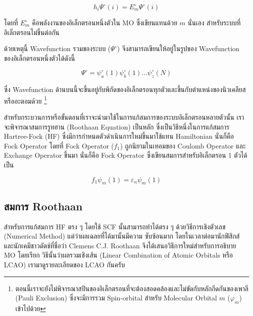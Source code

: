 \begin{equation}\label{eq:tise_elec_i}
    h_{i} \Psi^{\circ}(i) = E^{\circ}_{m} \Psi^{\circ}(i)
\end{equation}

\noindent โดยที่ $E^{\circ}_{m}$ คือพลังงานของอิเล็กตรอนหนึ่งตัวใน MO ซึ่งเขียนแทนด้วย $m$ นั่นเอง สำหรับระบบที่อิเล็กตรอนไม่ขึ้นต่อกัน

ด้วยเหตุนี้ Wavefunction รวมของระบบ ($\Psi^{\circ}$) จึงสามารถเขียนให้อยู่ในรูปของ Wavefunction ของอิเล็กตรอนหนึ่งตัวได้ดังนี้

\begin{equation}
    \Psi^{\circ} = \psi^{\circ}_{a}(1) \psi^{\circ}_{b}(1) \dots \psi^{\circ}_{z}(N)
\end{equation}

\noindent ซึ่ง Wavefunction ด้านบนนี้จะขึ้นอยู่กับพิกัดของอิเล็กตรอนทุกตัวและขึ้นกับตำแหน่งของนิวเคลียสหรืออะตอมด้วย%
\footnote{ตอนนี้เราจะยังไม่พิจารณาสปินของอิเล็กตรอนที่จะต้องสอดคล้องและไม่ขัดกับหลักกีดกันของเพาลี (Pauli Exclusion)
ซึ่งจะมีการรวม Spin-orbital สำหรับ Molecular Orbital $m$ ($\varphi_{m}$) เข้าไปด้วย}

สำหรับกระบวนการหรือขั้นตอนที่เราจะนำมาใช้ในการแก้สมการของระบบอิเล็กตรอนหลายตัวนั้น เราจะพิจารณาสมการรูทฮาน (Roothaan Equation) 
เป็นหลัก ซึ่งเป็นวิธีหนึ่งในการแก้สมการ Hartree-Fock (HF) ซึ่งมีการกำหนดตัวดำเนินการใหม่ขึ้นมาใช้แทน Hamiltonian นั่นก็คือ Fock Operator 
โดยที่ Fock Operator ($f_{1}$) ถูกนิยามในเทอมของ Coulomb Operator และ Exchange Operator ขึ้นมา นั่นก็คือ Fock Operator 
ซึ่งเขียนสมการสำหรับอิเล็กตรอน 1 ตัวได้เป็น

\begin{equation}\label{eq:fock}
    f_{1} \psi_{m}(1) = \varepsilon_{n} \psi_{m}(1)
\end{equation}

\subsection{สมการ Roothaan}
\label{ssec:roothaan}

สำหรับการแก้สมการ HF ตรง ๆ โดยใช้ SCF นั้นสามารถทำได้ตรง ๆ ด้วยวิธีการเชิงตัวเลข (Numerical Method) แต่ว่าผลเฉลยที่ได้มานั้นมีความ%
ซับซ้อนมาก โดยในเวลาต่อมานักฟิสิกส์และนักเคมีชาวดัตช์ที่ชื่อว่า Clemens C.J. Roothaan จึงได้เสนอวิธีการใหม่สำหรับการอธิบาย MO โดยเรียก%
วิธีนั้นว่าผลรวมเชิงเส้น (Linear Combination of Atomic Orbitals หรือ LCAO)\autocite{atkins2010} เรามาดูรายละเอียดของ LCAO 
กันครับ 

